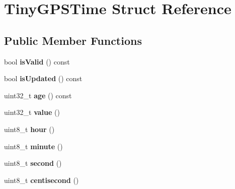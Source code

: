 \hypertarget{struct_tiny_g_p_s_time}{}\section{Tiny\+G\+P\+S\+Time Struct Reference}
\label{struct_tiny_g_p_s_time}
\subsection*{Public Member Functions}
\begin{DoxyCompactItemize}
\item 
bool {\bfseries is\+Valid} () const \hypertarget{struct_tiny_g_p_s_time_a85c38acaf804aecefc3f0358bf93d86a}{}\label{struct_tiny_g_p_s_time_a85c38acaf804aecefc3f0358bf93d86a}

\item 
bool {\bfseries is\+Updated} () const \hypertarget{struct_tiny_g_p_s_time_a48850598e5ae6dd6813bbfd5af7589fc}{}\label{struct_tiny_g_p_s_time_a48850598e5ae6dd6813bbfd5af7589fc}

\item 
uint32\+\_\+t {\bfseries age} () const \hypertarget{struct_tiny_g_p_s_time_a22b59e1d4b22435baa2a4446981f2dce}{}\label{struct_tiny_g_p_s_time_a22b59e1d4b22435baa2a4446981f2dce}

\item 
uint32\+\_\+t {\bfseries value} ()\hypertarget{struct_tiny_g_p_s_time_afcdb632fee9d144b1414c9d7b95719f1}{}\label{struct_tiny_g_p_s_time_afcdb632fee9d144b1414c9d7b95719f1}

\item 
uint8\+\_\+t {\bfseries hour} ()\hypertarget{struct_tiny_g_p_s_time_a37fdb629b6ed0e31134214c7d07df2b1}{}\label{struct_tiny_g_p_s_time_a37fdb629b6ed0e31134214c7d07df2b1}

\item 
uint8\+\_\+t {\bfseries minute} ()\hypertarget{struct_tiny_g_p_s_time_aef83c20c14d404219299da2d7e35cdce}{}\label{struct_tiny_g_p_s_time_aef83c20c14d404219299da2d7e35cdce}

\item 
uint8\+\_\+t {\bfseries second} ()\hypertarget{struct_tiny_g_p_s_time_a729cab36ced07eb5607503663fbe33e8}{}\label{struct_tiny_g_p_s_time_a729cab36ced07eb5607503663fbe33e8}

\item 
uint8\+\_\+t {\bfseries centisecond} ()\hypertarget{struct_tiny_g_p_s_time_a1f74ad4a2a53e0ee19f8e3a6b2bc985f}{}\label{struct_tiny_g_p_s_time_a1f74ad4a2a53e0ee19f8e3a6b2bc985f}

\end{DoxyCompactItemize}
